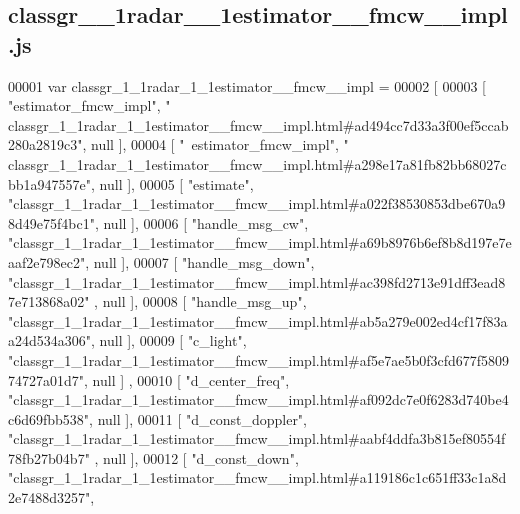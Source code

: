 \subsection{classgr\+\_\+\_\+1radar\+\_\+\_\+1estimator\+\_\+\+\_\+fmcw\+\_\+\+\_\+impl.\+js}
\label{classgr__1__1radar__1__1estimator____fmcw____impl_8js_source}

\begin{DoxyCode}
00001 var classgr_1_1radar_1_1estimator__fmcw__impl =
00002 [
00003     [ \textcolor{stringliteral}{"estimator\_fmcw\_impl"}, \textcolor{stringliteral}{"
      classgr\_1\_1radar\_1\_1estimator\_\_fmcw\_\_impl.html#ad494cc7d33a3f00ef5ccab280a2819c3"}, null ],
00004     [ \textcolor{stringliteral}{"~estimator\_fmcw\_impl"}, \textcolor{stringliteral}{"
      classgr\_1\_1radar\_1\_1estimator\_\_fmcw\_\_impl.html#a298e17a81fb82bb68027cbb1a947557e"}, null ],
00005     [ \textcolor{stringliteral}{"estimate"}, \textcolor{stringliteral}{"classgr\_1\_1radar\_1\_1estimator\_\_fmcw\_\_impl.html#a022f38530853dbe670a98d49e75f4bc1"}, null 
      ],
00006     [ \textcolor{stringliteral}{"handle\_msg\_cw"}, \textcolor{stringliteral}{"classgr\_1\_1radar\_1\_1estimator\_\_fmcw\_\_impl.html#a69b8976b6ef8b8d197e7eaaf2e798ec2"}, 
      null ],
00007     [ \textcolor{stringliteral}{"handle\_msg\_down"}, \textcolor{stringliteral}{"classgr\_1\_1radar\_1\_1estimator\_\_fmcw\_\_impl.html#ac398fd2713e91dff3ead87e713868a02"}
      , null ],
00008     [ \textcolor{stringliteral}{"handle\_msg\_up"}, \textcolor{stringliteral}{"classgr\_1\_1radar\_1\_1estimator\_\_fmcw\_\_impl.html#ab5a279e002ed4cf17f83aa24d534a306"}, 
      null ],
00009     [ \textcolor{stringliteral}{"c\_light"}, \textcolor{stringliteral}{"classgr\_1\_1radar\_1\_1estimator\_\_fmcw\_\_impl.html#af5e7ae5b0f3cfd677f580974727a01d7"}, null ]
      ,
00010     [ \textcolor{stringliteral}{"d\_center\_freq"}, \textcolor{stringliteral}{"classgr\_1\_1radar\_1\_1estimator\_\_fmcw\_\_impl.html#af092dc7e0f6283d740be4c6d69fbb538"}, 
      null ],
00011     [ \textcolor{stringliteral}{"d\_const\_doppler"}, \textcolor{stringliteral}{"classgr\_1\_1radar\_1\_1estimator\_\_fmcw\_\_impl.html#aabf4ddfa3b815ef80554f78fb27b04b7"}
      , null ],
00012     [ \textcolor{stringliteral}{"d\_const\_down"}, \textcolor{stringliteral}{"classgr\_1\_1radar\_1\_1estimator\_\_fmcw\_\_impl.html#a119186c1c651ff33c1a8d2e7488d3257"}, 

\end{DoxyCode}
